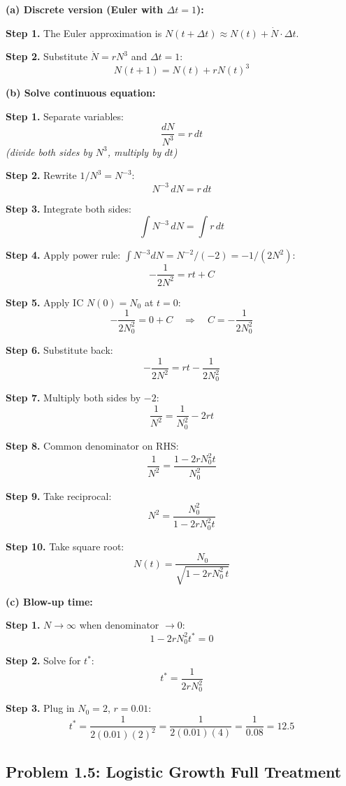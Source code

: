 \documentclass[10pt]{article}
\newcommand{\thus}{\quad\Longrightarrow\quad}
\newcommand{\stepwhy}[1]{\textcolor{blue!60!black}{\small\textit{(#1)}}}
\begin{document}
\begin{solution}
\textbf{(a) Discrete version (Euler with $\Delta t = 1$):}

\textbf{Step 1.} The Euler approximation is $N(t+\Delta t) \approx N(t) + \dot N \cdot \Delta t$.

\textbf{Step 2.} Substitute $\dot N = rN^3$ and $\Delta t = 1$:
\[
N(t+1) = N(t) + rN(t)^3
\]

\medskip\textbf{(b) Solve continuous equation:}

\textbf{Step 1.} Separate variables:
\[
\frac{dN}{N^3} = r\,dt
\]
\stepwhy{divide both sides by $N^3$, multiply by $dt$}

\textbf{Step 2.} Rewrite $1/N^3 = N^{-3}$:
\[
N^{-3}\,dN = r\,dt
\]

\textbf{Step 3.} Integrate both sides:
\[
\int N^{-3}\,dN = \int r\,dt
\]

\textbf{Step 4.} Apply power rule: $\int N^{-3}dN = N^{-2}/(-2) = -1/(2N^2)$:
\[
-\frac{1}{2N^2} = rt + C
\]

\textbf{Step 5.} Apply IC $N(0) = N_0$ at $t=0$:
\[
-\frac{1}{2N_0^2} = 0 + C \thus C = -\frac{1}{2N_0^2}
\]

\textbf{Step 6.} Substitute back:
\[
-\frac{1}{2N^2} = rt - \frac{1}{2N_0^2}
\]

\textbf{Step 7.} Multiply both sides by $-2$:
\[
\frac{1}{N^2} = \frac{1}{N_0^2} - 2rt
\]

\textbf{Step 8.} Common denominator on RHS:
\[
\frac{1}{N^2} = \frac{1 - 2rN_0^2 t}{N_0^2}
\]

\textbf{Step 9.} Take reciprocal:
\[
N^2 = \frac{N_0^2}{1 - 2rN_0^2 t}
\]

\textbf{Step 10.} Take square root:
\[
\boxed{N(t) = \frac{N_0}{\sqrt{1 - 2rN_0^2\,t}}}
\]

\medskip\textbf{(c) Blow-up time:}

\textbf{Step 1.} $N \to \infty$ when denominator $\to 0$:
\[
1 - 2rN_0^2 t^* = 0
\]

\textbf{Step 2.} Solve for $t^*$:
\[
t^* = \frac{1}{2rN_0^2}
\]

\textbf{Step 3.} Plug in $N_0 = 2$, $r = 0.01$:
\[
t^* = \frac{1}{2(0.01)(2)^2} = \frac{1}{2(0.01)(4)} = \frac{1}{0.08} = 12.5
\]
\end{solution}

\subsection{Problem 1.5: Logistic Growth Full Treatment}
\end{document}
